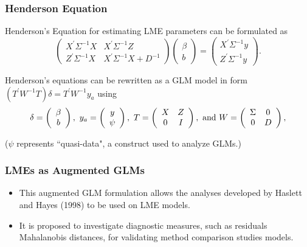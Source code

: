\begin{frame}\frametitle{Henderson Equation}
Henderson's Equation for estimating LME parameters can be formulated as
\[
\left(\begin{array}{cc}
  X^\prime\Sigma^{-1}X & X^\prime\Sigma^{-1}Z
  \\
  Z^\prime\Sigma^{-1}X & X^\prime\Sigma^{-1}X + D^{-1}
  \end{array}\right)
\left(\begin{array}{c}
    \beta \\
  b
  \end{array}\right)
  =
\left(\begin{array}{c}
  X^\prime\Sigma^{-1}y \\
  Z^\prime\Sigma^{-1}y
  \end{array}\right).\]


Henderson's equations can be rewritten as a GLM model in form $( T^\prime W^{-1} T ) \delta = T^\prime W^{-1} y_{a} $ using
\[
\delta = \left(\begin{array}{c}\beta \\ b \end{array}\right),
\ y_{a} = \left(\begin{array}{c}
  y \cr \psi
  \end{array}\right),
\ T = \left(\begin{array}{cc}
  X & Z  \\
  0 & I
  \end{array}\right),
\ \textrm{and} \ W = \left(\begin{array}{cc}
  \Sigma & 0  \cr
  0 &  D \end{array}\right),
\]
 
($\psi$ represents ``quasi-data", a construct used to analyze GLMs.)
 
\end{frame}


\begin{frame}\frametitle{LMEs as Augmented GLMs}

\begin{itemize}\item This augmented GLM formulation allows the analyses developed by Haslett and Hayes (1998) to be used on LME models. \item It is proposed to investigate diagnostic measures, such as residuals Mahalanobis distances, for validating method comparison studies models.\\
\end{itemize}



\end{frame}


